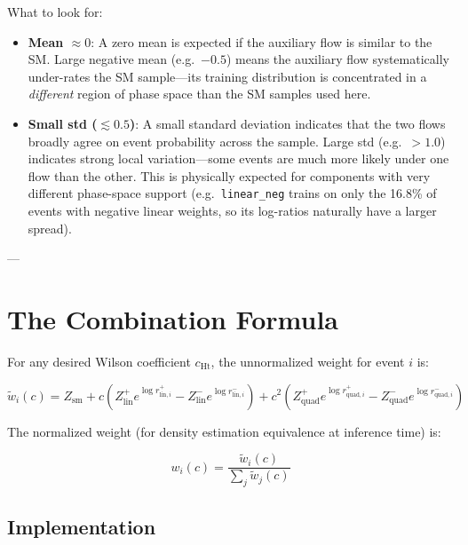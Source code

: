 \documentclass[11pt,a4paper]{article}
\begin{document}
What to look for:
\begin{itemize}
  \item \textbf{Mean $\approx 0$}: A zero mean is expected if the auxiliary flow is similar to the SM.
        Large negative mean (e.g.\ $-0.5$) means the auxiliary flow systematically under-rates the
        SM sample---its training distribution is concentrated in a \emph{different} region of phase
        space than the SM samples used here.
  \item \textbf{Small std ($\lesssim 0.5$)}: A small standard deviation indicates that the two flows
        broadly agree on event probability across the sample.  Large std (e.g.\ $> 1.0$) indicates
        strong local variation---some events are much more likely under one flow than the other.  This
        is physically expected for components with very different phase-space support (e.g.\
        \texttt{linear\_neg} trains on only the 16.8\% of events with negative linear weights, so
        its log-ratios naturally have a larger spread).
\end{itemize}

---

\section{The Combination Formula}
\label{sec:combo}

For any desired Wilson coefficient $c_{\text{Ht}}$, the unnormalized weight for event $i$ is:

\begin{equation}
\tilde{w}_i(c) = Z_{\text{sm}} + c \left(Z_{\text{lin}}^+ e^{\log r_{\text{lin},i}^+} - Z_{\text{lin}}^- e^{\log r_{\text{lin},i}^-}\right) 
                 + c^2 \left(Z_{\text{quad}}^+ e^{\log r_{\text{quad},i}^+} - Z_{\text{quad}}^- e^{\log r_{\text{quad},i}^-}\right)
\end{equation}

The normalized weight (for density estimation equivalence at inference time) is:

\begin{equation}
w_i(c) = \frac{\tilde{w}_i(c)}{\sum_j \tilde{w}_j(c)}
\end{equation}

\subsection{Implementation}
\end{document}
